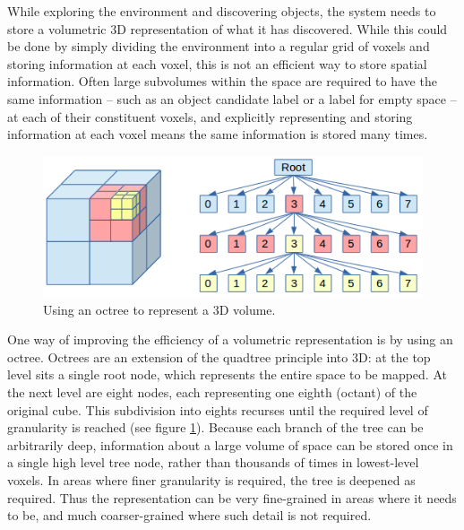 
While exploring the environment and discovering objects, the system needs to store a volumetric 3D representation of what it has discovered.
While this could be done by simply dividing the environment into a regular grid of voxels and storing information at each voxel, this is not an efficient way to store spatial information.
Often large subvolumes within the space are required to have the same information -- such as an object candidate label or a label for empty space -- at each of their constituent voxels, and explicitly representing and storing information at each voxel means the same information is stored many times.

\begin{figure}[ht]
	\begin{center}
		\includegraphics[width=0.7\linewidth]{src/octree.png} 
		\caption[Using an octree to represent a 3D volume]{Using an octree to represent a 3D volume.\footnotemark}
		\label{fig:octree}
	\end{center}
\end{figure}

One way of improving the efficiency of a volumetric representation is by using an octree\cite{meagher1982octrees}.
Octrees are an extension of the quadtree principle into 3D: at the top level sits a single root node, which represents the entire space to be mapped.
At the next level are eight nodes, each representing one eighth (octant) of the original cube.
This subdivision into eights recurses until the required level of granularity is reached (see figure \ref{fig:octree}).
Because each branch of the tree can be arbitrarily deep, information about a large volume of space can be stored once in a single high level tree node, rather than thousands of times in lowest-level voxels.
In areas where finer granularity is required, the tree is deepened as required.
Thus the representation can be very fine-grained in areas where it needs to be, and much coarser-grained where such detail is not required.
